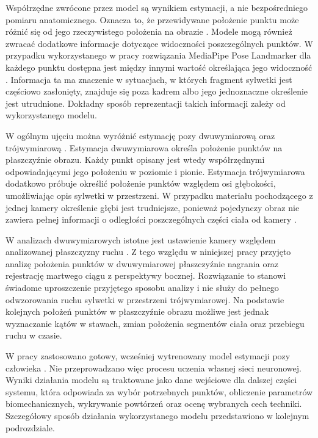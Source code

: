 Współrzędne zwrócone przez model są wynikiem estymacji, a nie bezpośredniego pomiaru anatomicznego. Oznacza to, że przewidywane położenie punktu może różnić się od jego rzeczywistego położenia na obrazie \cite{wade2022markerless}. Modele mogą również zwracać dodatkowe informacje dotyczące widoczności poszczególnych punktów. W przypadku wykorzystanego w pracy rozwiązania MediaPipe Pose Landmarker dla każdego punktu dostępna jest między innymi wartość określająca jego widoczność \cite{mediapipe_pose_landmarker}. Informacja ta ma znaczenie w sytuacjach, w których fragment sylwetki jest częściowo zasłonięty, znajduje się poza kadrem albo jego jednoznaczne określenie jest utrudnione. Dokładny sposób reprezentacji takich informacji zależy od wykorzystanego modelu.

W ogólnym ujęciu można wyróżnić estymację pozy dwuwymiarową oraz trójwymiarową \cite{chen2020monocular}. Estymacja dwuwymiarowa określa położenie punktów na płaszczyźnie obrazu. Każdy punkt opisany jest wtedy współrzędnymi odpowiadającymi jego położeniu w poziomie i pionie. Estymacja trójwymiarowa dodatkowo próbuje określić położenie punktów względem osi głębokości, umożliwiając opis sylwetki w przestrzeni. W przypadku materiału pochodzącego z jednej kamery określenie głębi jest trudniejsze, ponieważ pojedynczy obraz nie zawiera pełnej informacji o odległości poszczególnych części ciała od kamery \cite{wade2022markerless}.

W analizach dwuwymiarowych istotne jest ustawienie kamery względem analizowanej płaszczyzny ruchu \cite{wade2022markerless}. Z tego względu w niniejszej pracy przyjęto analizę położenia punktów w dwuwymiarowej płaszczyźnie nagrania oraz rejestrację martwego ciągu z perspektywy bocznej. Rozwiązanie to stanowi świadome uproszczenie przyjętego sposobu analizy i nie służy do pełnego odwzorowania ruchu sylwetki w przestrzeni trójwymiarowej. Na podstawie kolejnych położeń punktów w płaszczyźnie obrazu możliwe jest jednak wyznaczanie kątów w stawach, zmian położenia segmentów ciała oraz przebiegu ruchu w czasie.

W pracy zastosowano gotowy, wcześniej wytrenowany model estymacji pozy człowieka \cite{mediapipe_pose_landmarker,bazarevsky2020blazepose}. Nie przeprowadzano więc procesu uczenia własnej sieci neuronowej. Wyniki działania modelu są traktowane jako dane wejściowe dla dalszej części systemu, która odpowiada za wybór potrzebnych punktów, obliczenie parametrów biomechanicznych, wykrywanie powtórzeń oraz ocenę wybranych cech techniki. Szczegółowy sposób działania wykorzystanego modelu przedstawiono w kolejnym podrozdziale.

